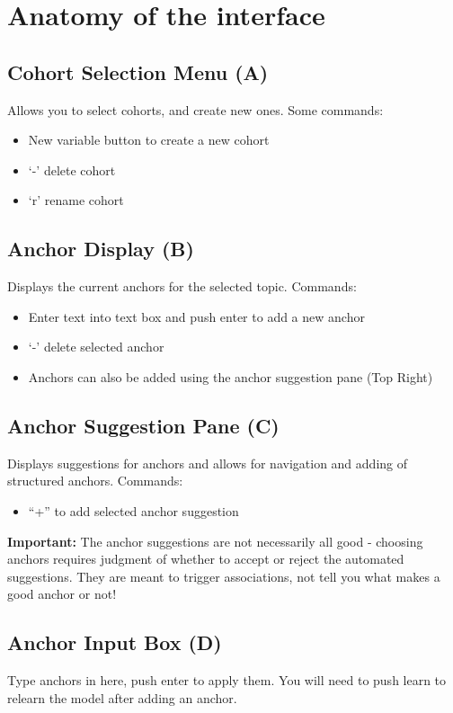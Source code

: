 \documentclass[12pt]{article}
\begin{document}
\section{Anatomy of the interface}
\label{sec:anatomy}
\subsection{Cohort Selection Menu (A)}
Allows you to select cohorts, and create new ones.
Some commands:
\begin{itemize}
\item New variable button to create a new cohort
\item `-' delete cohort
\item `r' rename cohort
\end{itemize}


\subsection{Anchor Display (B)}
Displays the current anchors for the selected topic.
Commands:
\begin{itemize}
\item Enter text into text box and push enter to add a new anchor
\item `-' delete selected anchor
\item Anchors can also be added using the anchor suggestion pane (Top Right)
\end{itemize}

\subsection{Anchor Suggestion Pane (C)}
Displays suggestions for anchors and allows for navigation and adding of structured anchors.
Commands:
\begin{itemize}
\item ``+'' to add selected anchor suggestion
\end{itemize}
{\bf Important:} The anchor suggestions are not necessarily all good - choosing anchors requires judgment of whether to accept or reject the automated suggestions. They are  meant to trigger associations, not  tell you what makes a good anchor or not!

\subsection{Anchor Input Box (D)}
Type anchors in here, push enter to apply them. You will need to push learn to relearn the model after adding an anchor.
\end{document}
